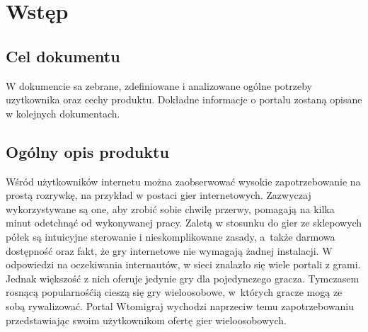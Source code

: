 \documentclass[11pt,leqno]{article}
\begin{document}


\newpage
\section{Wstęp}

\subsection{Cel dokumentu}
W dokumencie sa zebrane, zdefiniowane i analizowane ogólne potrzeby uzytkownika oraz cechy produktu. Dokładne informacje o portalu zostaną opisane w kolejnych dokumentach. 

\subsection{Ogólny opis produktu}
Wśród użytkowników internetu można zaobserwować wysokie zapotrzebowanie na prostą rozrywkę, na przykład w postaci gier internetowych. Zazwyczaj wykorzystywane są one, aby zrobić sobie chwilę przerwy, pomagają na kilka minut odetchnąć od wykonywanej pracy. Zaletą w stosunku do gier ze sklepowych półek są intuicyjne sterowanie i nieskomplikowane zasady, a~także darmowa dostępność oraz fakt, że gry internetowe nie wymagają żadnej instalacji. W odpowiedzi na oczekiwania internautów, w sieci znalazło się wiele portali z grami. Jednak większość z nich oferuje jedynie gry dla pojedynczego gracza. Tymczasem rosnącą popularnośćią cieszą się gry wieloosobowe, w~których gracze mogą ze sobą rywalizować. Portal Wtomigraj wychodzi naprzeciw temu zapotrzebowaniu przedstawiając swoim użytkownikom ofertę gier wieloosobowych. 
\end{document}
